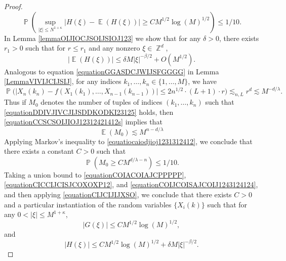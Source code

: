 \documentclass[dvipsnames,letterpaper,12pt]{article}
\numberwithin{equation}{section}
\DeclareMathOperator{\ZZ}{\mathbb{Z}}
\numberwithin{theorem}{section}
\DeclareMathOperator{\EE}{\mathbb{E}}
\DeclareMathOperator{\PP}{\mathbb{P}}
\begin{document}
\begin{proof}
    \begin{equation} \label{equationCICCIJCISJCOXOXP12}
        \PP \left( \sup_{|\xi| \leq N^{1 + \kappa}} | H(\xi) - \EE(H(\xi)) | \geq C M^{1/2} \log(M)^{1/2} \right) \leq 1/10.
    \end{equation}
    In Lemma \ref{lemmaOIJIOCJSOIJSIOJ123} we show that for any $\delta > 0$, there exists $r_1 > 0$ such that for $r \leq r_1$ and any nonzero $\xi \in \ZZ^d$,
    \begin{equation} \label{equationCIJCIJIJXSO}
        |\EE(H(\xi))| \leq \delta M |\xi|^{-\beta/2} + O(M^{1/2}).
    \end{equation}
    Analogous to equation \eqref{equationGGASDCJWIJSFGGGG} in Lemma \ref{LemmaVIVIJCIJSIJ}, for any indices $k_1,\dots,k_n \in \{ 1, \dots, M \}$, we have
    \begin{equation} \label{equationCCSCSOIJIOJ12312421412s}
        \PP \Big( |X_n(k_n) - f(X_1(k_1),\dots,X_{n-1}(k_{n-1}))| \leq 2 n^{1/2} \cdot (L+1) \cdot r \Big) \lesssim_{n,L} r^d \lesssim M^{-d/\lambda}.
    \end{equation}
    Thus if $M_0$ denotes the number of tuples of indices $(k_1,\dots,k_n)$ such that \eqref{equationDDIVJIVCJIJSDDKODKI23125} holds, then \eqref{equationCCSCSOIJIOJ12312421412s} implies that
    \begin{equation} \label{equatiocaiodjioj1231312412}
        \EE(M_0) \lesssim M^{n-d/\lambda}
    \end{equation}
    Applying Markov's inequality to \eqref{equatiocaiodjioj1231312412}, we conclude that there exists a constant $C > 0$ such that
    \begin{equation} \label{equationCOIJCOISAJCOIJ1243124124}
        \PP(M_0 \geq C M^{d/\lambda - n}) \leq 1/10.
    \end{equation}
    Taking a union bound to \eqref{equationCOIACOIAJCPPPPP}, \eqref{equationCICCIJCISJCOXOXP12}, and \eqref{equationCOIJCOISAJCOIJ1243124124}, and then applying \eqref{equationCIJCIJIJXSO}, we conclude that there exists $C > 0$ and a particular instantiation of the random variables $\{ X_i(k) \}$ such that for any $0 < |\xi| \leq M^{1 + \kappa}$,
    \begin{equation} \label{equatioACOINAWCOWANCOIWAN}
        |G(\xi)| \leq CM^{1/2} \log(M)^{1/2},
    \end{equation}
    and
    \begin{equation} \label{equatioNCOIJCOIJOIJO12312421412}
        |H(\xi)| \leq C M^{1/2} \log(M)^{1/2} + \delta M |\xi|^{-\beta/2}.

\end{equation}
\end{proof}
\end{document}
